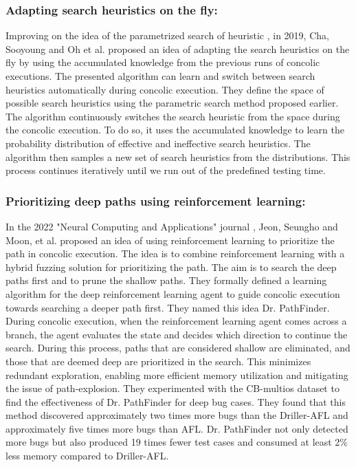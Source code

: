 \documentclass[ runningheads,
               a4paper]{llncs}
\begin{document}
\subsubsection{Adapting search heuristics on the fly:}
Improving on the idea of the parametrized search of heuristic \cite{cha2018automatically}, in 2019, Cha, Sooyoung and Oh et al. proposed an idea \cite{adapt2019heuristic} of adapting the search heuristics on the fly by using the accumulated knowledge from the previous runs of concolic executions. The presented algorithm can learn and switch between search heuristics automatically during concolic execution. They define the space of possible search heuristics using the parametric search method \cite{adapt2019heuristic} proposed earlier. The algorithm continuously switches the search heuristic from the space during the concolic execution. To do so, it uses the accumulated knowledge to learn the probability distribution of effective and ineffective search heuristics. The algorithm then samples a new set of search heuristics from the distributions. This process continues iteratively until we run out of the predefined testing time.


\subsubsection{Prioritizing deep paths using reinforcement learning:}
In the 2022 "Neural Computing and Applications" journal \cite{drPathfinder2022}, Jeon, Seungho and Moon, et al. proposed an idea \cite[Dr. PathFinder]{drPathfinder2022} of using reinforcement learning to prioritize the path in concolic execution. The idea is to combine reinforcement learning with a hybrid fuzzing \cite{miller1990empirical, godefroid2012sage} solution for prioritizing the path. The aim is to search the deep paths first and to prune the shallow paths. They formally defined a learning algorithm for the deep reinforcement learning agent to guide concolic execution towards searching a deeper path first. They named this idea Dr. PathFinder. During concolic execution, when the reinforcement learning agent comes across a branch, the agent evaluates the state and decides which direction to continue the search. During this process, paths that are considered shallow are eliminated, and those that are deemed deep are prioritized in the search. This minimizes redundant exploration, enabling more efficient memory utilization and mitigating the issue of path-explosion. They experimented with the CB-multios dataset to find the effectiveness of Dr. PathFinder for deep bug cases.  They found that this method discovered approximately two times more bugs than the Driller-AFL and approximately five times more bugs than AFL. Dr. PathFinder not only detected more bugs but also produced 19 times fewer test cases and consumed at least 2\% less memory compared to Driller-AFL.
\end{document}

